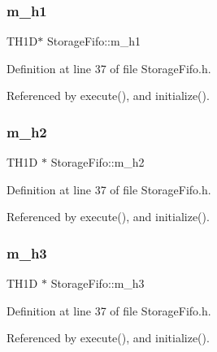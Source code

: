 \subsubsection{\texorpdfstring{m\+\_\+h1}{m\_h1}}
{\footnotesize\ttfamily T\+H1D$\ast$ Storage\+Fifo\+::m\+\_\+h1\hspace{0.3cm}{\ttfamily [private]}}



Definition at line 37 of file Storage\+Fifo.\+h.



Referenced by execute(), and initialize().

\mbox{\label{classStorageFifo_a3caf6211541aaa4be8e60c03d79bf253}} 
\subsubsection{\texorpdfstring{m\+\_\+h2}{m\_h2}}
{\footnotesize\ttfamily T\+H1D $\ast$ Storage\+Fifo\+::m\+\_\+h2\hspace{0.3cm}{\ttfamily [private]}}



Definition at line 37 of file Storage\+Fifo.\+h.



Referenced by execute(), and initialize().

\mbox{\label{classStorageFifo_a7e6b54c96a9b53a9917f7f21bda12b2e}} 
\subsubsection{\texorpdfstring{m\+\_\+h3}{m\_h3}}
{\footnotesize\ttfamily T\+H1D $\ast$ Storage\+Fifo\+::m\+\_\+h3\hspace{0.3cm}{\ttfamily [private]}}



Definition at line 37 of file Storage\+Fifo.\+h.



Referenced by execute(), and initialize().

\mbox{\label{classStorageFifo_ad026ffc1c7590bb3563538490be9aa00}} 
